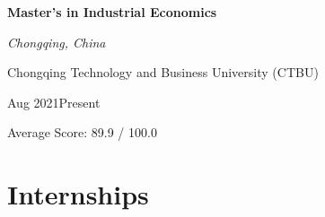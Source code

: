 \documentclass[a4paper,20pt]{article}
\begin{document}
    \begin{minipage}{.75\linewidth} \begin{flushleft}
\textbf{Master’s in Industrial Economics}
\end{flushleft} \end{minipage}
    \hfill 
    \begin{minipage}{.20\linewidth}\begin{flushright}
    	 \textit{Chongqing, China}
    	\end{flushright}\end{minipage}
    	
    	\begin{minipage}{.75\linewidth} \begin{flushleft}
     Chongqing Technology and Business University (CTBU)
     \\
    	\end{flushleft} \end{minipage}
         \hfill 
        \begin{minipage}{.20\linewidth}\begin{flushright}
        	 Aug 2021\textemdash Present
        	\end{flushright}\end{minipage}
        \begin{minipage}{.75\linewidth} \begin{flushleft}
    	    Average Score: 89.9 / 100.0 \\
    	\end{flushleft} 
     \end{minipage}


\section{Internships}
\end{document}
